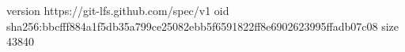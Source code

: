 version https://git-lfs.github.com/spec/v1
oid sha256:bbcfff884a1f5db35a799ce25082ebb5f6591822ff8e6902623995ffadb07c08
size 43840
